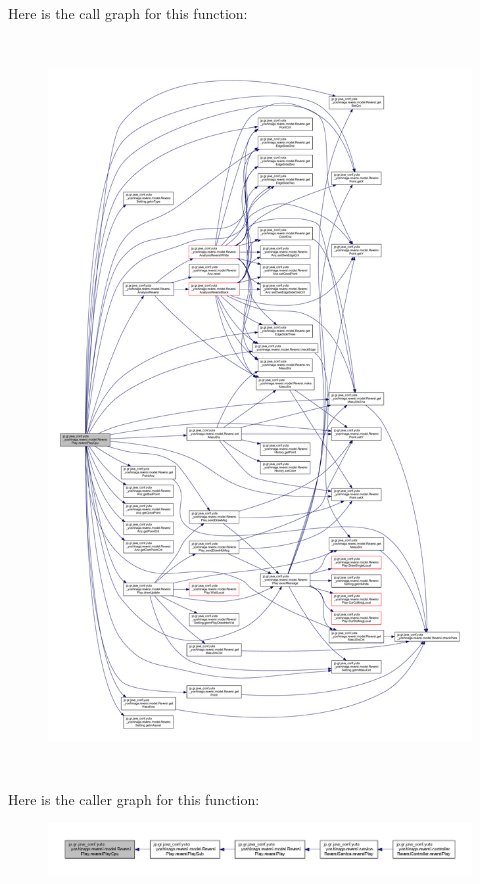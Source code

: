 Here is the call graph for this function\+:
\nopagebreak
\begin{figure}[H]
\begin{center}
\leavevmode
\includegraphics[height=550pt]{classjp_1_1gr_1_1java__conf_1_1yuta__yoshinaga_1_1reversi_1_1model_1_1_reversi_play_a1b1b5c91163c374bc2e0bf23ff922617_cgraph}
\end{center}
\end{figure}
Here is the caller graph for this function\+:
\nopagebreak
\begin{figure}[H]
\begin{center}
\leavevmode
\includegraphics[width=350pt]{classjp_1_1gr_1_1java__conf_1_1yuta__yoshinaga_1_1reversi_1_1model_1_1_reversi_play_a1b1b5c91163c374bc2e0bf23ff922617_icgraph}
\end{center}
\end{figure}
